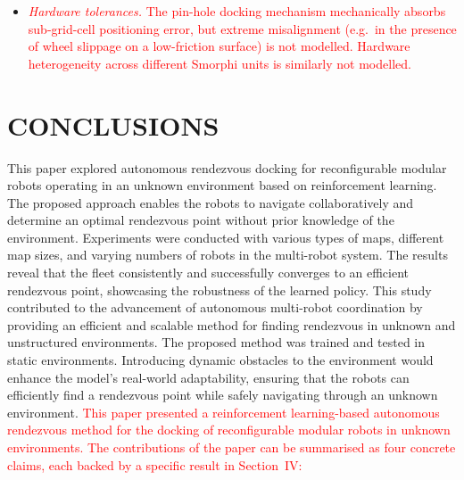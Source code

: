\documentclass[journal]{IEEEtran}
\begin{document}
\begin{itemize}
\item \textcolor{red}{\emph{Hardware tolerances.} The pin-hole docking mechanism mechanically absorbs sub-grid-cell positioning error, but extreme misalignment (e.g.\ in the presence of wheel slippage on a low-friction surface) is not modelled. Hardware heterogeneity across different Smorphi units is similarly not modelled.}
\end{itemize}

\section{CONCLUSIONS}
\textcolor{green!60!black}{This paper explored autonomous rendezvous docking for reconfigurable modular robots operating in an unknown environment based on reinforcement learning. The proposed approach enables the robots to navigate collaboratively and determine an optimal rendezvous point without prior knowledge of the environment. Experiments were conducted with various types of maps, different map sizes, and varying numbers of robots in the multi-robot system. The results reveal that the fleet consistently and successfully converges to an efficient rendezvous point, showcasing the robustness of the learned policy. This study contributed to the advancement of autonomous multi-robot coordination by providing an efficient and scalable method for finding rendezvous in unknown and unstructured environments. The proposed method was trained and tested in static environments. Introducing dynamic obstacles to the environment would enhance the model's real-world adaptability, ensuring that the robots can efficiently find a rendezvous point while safely navigating through an unknown environment.}
\textcolor{red}{This paper presented a reinforcement learning-based autonomous rendezvous method for the docking of reconfigurable modular robots in unknown environments. The contributions of the paper can be summarised as four concrete claims, each backed by a specific result in Section~IV:}
\end{document}
